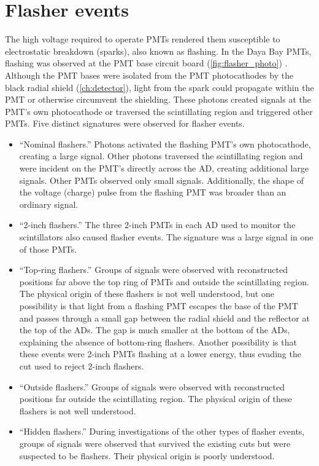 \section{Flasher events}
\label{sec:flashers}

The high voltage required to operate PMTs rendered them susceptible
to electrostatic breakdown (sparks), also known as flashing.
In the Daya Bay PMTs, flashing was observed
at the PMT base circuit board (\cref{fig:flasher_photo}) \cite{flasherphotos_docdb}.
Although the PMT bases were isolated from the
PMT photocathodes by the black radial shield (\cref{ch:detector}),
light from the spark could propagate within the PMT
or otherwise circumvent the shielding.
These photons created signals at the PMT's own photocathode
or traversed the scintillating region and triggered other PMTs.
Five distinct signatures were observed for flasher events.
\begin{itemize}
    \item ``Nominal flashers.'' Photons activated the flashing PMT's own photocathode,
        creating a large signal.
        Other photons traversed the scintillating region and were incident
        on the PMT's directly across the AD, creating additional large signals.
        Other PMTs observed only small signals.
        Additionally, the shape of the voltage (charge) pulse from the
        flashing PMT was broader than an ordinary signal.
    \item ``2-inch flashers.'' The three 2-inch PMTs in each AD
        used to monitor the scintillators also caused flasher events.
        The signature was a large signal in one of those PMTs.
    \item ``Top-ring flashers.'' Groups of signals were observed
        with reconstructed positions far above the top ring of PMTs
        and outside the scintillating region.
        The physical origin of these flashers is not well understood,
        but one possibility is that light from a flashing PMT
        escapes the base of the PMT
        and passes through a small gap between the radial shield
        and the reflector at the top of the ADs.
        The gap is much smaller at the bottom of the ADs,
        explaining the absence of bottom-ring flashers.
        Another possibility is that these events
        were 2-inch PMTs flashing at a lower energy,
        thus evading the cut used to reject 2-inch flashers.
    \item ``Outside flashers.'' Groups of signals were observed
        with reconstructed positions far outside the scintillating region.
        The physical origin of these flashers is not well understood.
    \item ``Hidden flashers.''
        During investigations of the other types of flasher events,
        groups of signals were observed that survived the existing cuts
        but were suspected to be flashers.
        Their physical origin is poorly understood.
\end{itemize}

